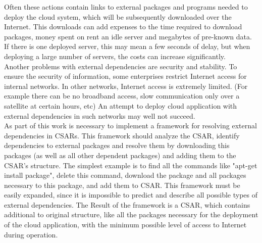 Often these actions contain links to external packages and programs needed to deploy the cloud system, which will be subsequently downloaded over the Internet.
This downloads can add expenses to the time required to download packages, money spent on rent an idle server and megabytes of pre-known data.
If there is one deployed server, this may mean a few seconds of delay, but when deploying a large number of servers, the costs can increase significantly.\\
Another problems with external dependencies are security and stability.
To ensure the security of information, some enterprises restrict Internet access for internal networks.
In other networks, Internet access is extremely limited.
(For example there can be no broadband access, slow communication only over a satellite at certain hours, etc)
An attempt to deploy cloud application with external dependencies in such networks may well not succeed. \\
As part of this work is necessary to implement a framework for resolving external dependencies in CSARs.
This framework should analyze the CSAR, identify dependencies to external packages and resolve them by downloading this packages (as well as all other dependent packages) and adding them to the CSAR's structure.
The simplest example is to find all the commands like "apt-get install package", delete this command, download the package and all packages necessary to this package, and add them to CSAR.
This framework must be easily expanded, since it is impossible to predict and describe all possible types of external dependencies.
The Result of the framework is a CSAR, which contains additional to original structure, like all the packages necessary for the deployment of the cloud application, with the minimum possible level of access to Internet during operation.


